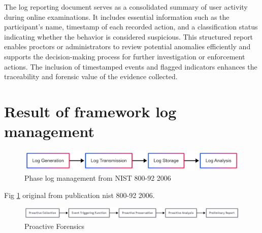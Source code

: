 The log reporting document serves as a consolidated summary of user activity during online examinations. It includes essential information such as the participant's name, timestamp of each recorded action, and a classification status indicating whether the behavior is considered suspicious. This structured report enables proctors or administrators to review potential anomalies efficiently and supports the decision-making process for further investigation or enforcement actions. The inclusion of timestamped events and flagged indicators enhances the traceability and forensic value of the evidence collected.

\section{Result of framework log management}


\begin{figure}[H] 
    \centering
    \includegraphics[width=14cm]{figure/log-management-nist-800-92-original.png}
    \caption{ Phase log management from NIST 800-92 2006 \citet{kentnist800922006guide}}
    \label{fig:nist-log-management}
\end{figure}

Fig \ref{fig:nist-log-management} original from publication nist 800-92 2006.
\begin{figure}[H] 
    \centering
    \includegraphics[width=14cm]{figure/proactive-collection.png}
    \caption{ Proactive Forensics \citet{proactiveandreactivedigitalforensics}}
    \label{fig:proactive-forensic}
\end{figure}


